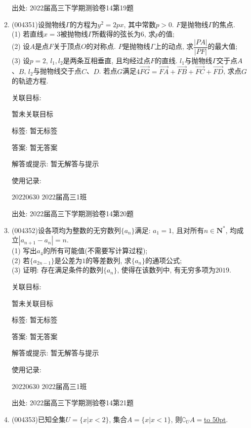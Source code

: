 \documentclass[10pt,a4paper]{article}
\newcommand{\blank}[1]{\underline{\hbox to #1pt{}}}
\begin{document}
\begin{enumerate}[1.]
出处: 2022届高三下学期测验卷14第19题
\item { (004351)}设抛物线$\Gamma$的方程为$y^2=2px$, 其中常数$p>0$. $F$是抛物线$\Gamma$的焦点.\\
(1) 若直线$x=3$被抛物线$\Gamma$所截得的弦长为$6$, 求$p$的值;\\
(2) 设$A$是点$F$关于顶点$O$的对称点. $P$是抛物线$\Gamma$上的动点, 求$\dfrac{|PA|}{|PF|}$的最大值;\\
(3) 设$p=2$, $l_1,l_2$是两条互相垂直, 且均经过点$F$的直线. $l_1$与抛物线$\Gamma$交于点$A$、$B$, $l_2$与抛物线交于点$C$、$D$. 若点$G$满足$4\overrightarrow{FG}=\overrightarrow{FA}+\overrightarrow{FB}+\overrightarrow{FC}+\overrightarrow{FD}$, 求点$G$的轨迹方程.


关联目标:

暂未关联目标



标签: 暂无标签

答案: 暂无答案

解答或提示: 暂无解答与提示

使用记录:

20220630	2022届高三1班			


出处: 2022届高三下学期测验卷14第20题
\item { (004352)}设各项均为整数的无穷数列$\{a_n\}$满足: $a_1=1$, 且对所有$n\in \mathbf{N}^*$, 均成立$|a_{n+1}-a_n|=n$.\\
(1) 写出$a_4$的所有可能值(不需要写计算过程);\\
(2) 若$\{a_{2n-1}\}$是公差为$1$的等差数列, 求$\{{a_n}\}$的通项公式;\\
(3) 证明: 存在满足条件的数列$\{a_n\}$, 使得在该数列中, 有无穷多项为$2019$.


关联目标:

暂未关联目标



标签: 暂无标签

答案: 暂无答案

解答或提示: 暂无解答与提示

使用记录:

20220630	2022届高三1班			


出处: 2022届高三下学期测验卷14第21题
\item { (004353)}已知全集$U=\{x|x<2\}$, 集合$A=\{x|x<1\}$, 则$\complement_UA=$\blank{50}.



\end{enumerate}
\end{document}

